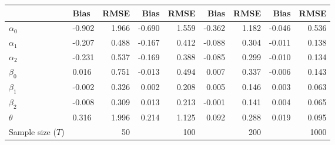 
\begin{tabular}[t]{llrrrrrrr}
\toprule
  & Bias & RMSE & Bias & RMSE & Bias & RMSE & Bias & RMSE\\
\midrule
$\alpha_{0}$ & -0.902 & 1.966 & -0.690 & 1.559 & -0.362 & 1.182 & -0.046 & 0.536\\
$\alpha_{1}$ & -0.207 & 0.488 & -0.167 & 0.412 & -0.088 & 0.304 & -0.011 & 0.138\\
$\alpha_{2}$ & -0.231 & 0.537 & -0.169 & 0.388 & -0.085 & 0.299 & -0.010 & 0.134\\
$\beta_{0}$ & 0.016 & 0.751 & -0.013 & 0.494 & 0.007 & 0.337 & -0.006 & 0.143\\
$\beta_{1}$ & -0.002 & 0.326 & 0.002 & 0.208 & 0.005 & 0.146 & 0.003 & 0.063\\
$\beta_{2}$ & -0.008 & 0.309 & 0.013 & 0.213 & -0.001 & 0.141 & 0.004 & 0.065\\
$\theta$ & 0.316 & 1.996 & 0.214 & 1.125 & 0.092 & 0.288 & 0.019 & 0.095\\
Sample size ($T$) &  & 50 &  & 100 &  & 200 &  & 1000\\
\bottomrule
\end{tabular}
